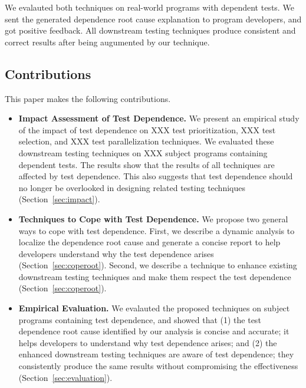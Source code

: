 We evalauted both techniques on real-world programs with dependent
tests. We sent the generated dependence root cause explanation
to program developers, and got positive feedback. All downstream
testing techniques produce consistent and correct results
after being augumented by our technique.

\subsection{Contributions}

This paper makes the following contributions.

\begin{itemize}

\item \textbf{Impact Assessment of Test Dependence.}
We present an empirical study of the impact of test dependence
on XXX test prioritization, XXX test selection, and XXX
test parallelization techniques. We evaluated these downstream
testing techniques on XXX subject programs containing
dependent tests. The results show that the results of
all techniques are affected by test dependence. This also
suggests that test dependence should no longer be overlooked
in designing related testing techniques (Section~\ref{sec:impact}).

\item \textbf{Techniques to Cope with Test Dependence.}
We propose two general ways to cope with test dependence.
First, we describe a dynamic analysis to localize the dependence
root cause and generate a concise report to help developers
understand why the test dependence arises (Section~\ref{sec:coperoot}).
Second, we describe a technique to enhance existing downstream
testing techniques and make them respect the test dependence
(Section~\ref{sec:coperoot}). 

\item \textbf{Empirical Evaluation.} We evalauted the proposed
techniques on subject programs containing test dependence, and
showed that (1) the test dependence root cause identified by
our analysis is concise and accurate; it helps developers
to understand why test dependence arises; and (2) the enhanced
downstream testing techniques are aware of test dependence;
they consistently produce the same results without compromising
the effectiveness (Section~\ref{sec:evaluation}).

\end{itemize}

